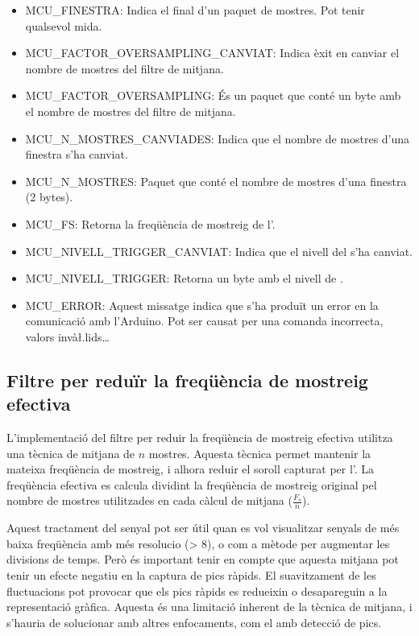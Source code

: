 \documentclass{tfgitic}[2023/06/30]
\begin{document}
\begin{itemize}
\item MCU\_FINESTRA: Indica el final d'un paquet de mostres. Pot tenir
  qualsevol mida.
\item MCU\_FACTOR\_OVERSAMPLING\_CANVIAT: Indica èxit en canviar el
  nombre de mostres del filtre de mitjana.
\item MCU\_FACTOR\_OVERSAMPLING: És un paquet que conté un byte amb el
  nombre de mostres del filtre de mitjana.
\item MCU\_N\_MOSTRES\_CANVIADES: Indica que el nombre de mostres
  d'una finestra s'ha canviat.
\item MCU\_N\_MOSTRES: Paquet que conté el nombre de mostres d'una
  finestra (2 bytes).
\item MCU\_FS: Retorna la freqüència de mostreig de l'.
\item MCU\_NIVELL\_TRIGGER\_CANVIAT: Indica que el nivell del
   s'ha canviat.
\item MCU\_NIVELL\_TRIGGER: Retorna un byte amb el nivell de
  .
\item MCU\_ERROR: Aquest missatge indica que s'ha produït un error en
  la comunicació amb l'Arduino. Pot ser causat per una comanda
  incorrecta, valors invà\l.lids\dots
\end{itemize}

\subsection{Filtre per reduïr la freqüència de mostreig efectiva}

L'implementació del filtre per reduir la freqüència de mostreig
efectiva utilitza una tècnica de mitjana de $n$ mostres. Aquesta
tècnica permet mantenir la mateixa freqüència de mostreig, i alhora
reduir el soroll capturat per l'. La freqüència efectiva es
calcula dividint la freqüència de mostreig original pel nombre de
mostres utilitzades en cada càlcul de mitjana ($\frac{F_{s}}{n}$).

Aquest tractament del senyal pot ser útil quan es vol visualitzar
senyals de més baixa freqüència amb més resolucio (> \SI{8}{\bits}), o
com a mètode per augmentar les divisions de temps. Però és important
tenir en compte que aquesta mitjana pot tenir un efecte negatiu en la
captura de pics ràpids. El suavitzament de les fluctuacions pot
provocar que els pics ràpids es redueixin o desapareguin a la
representació gràfica. Aquesta és una limitació inherent de la tècnica
de mitjana, i s'hauria de solucionar amb altres enfocaments, com el
 amb detecció de pics.
\end{document}
